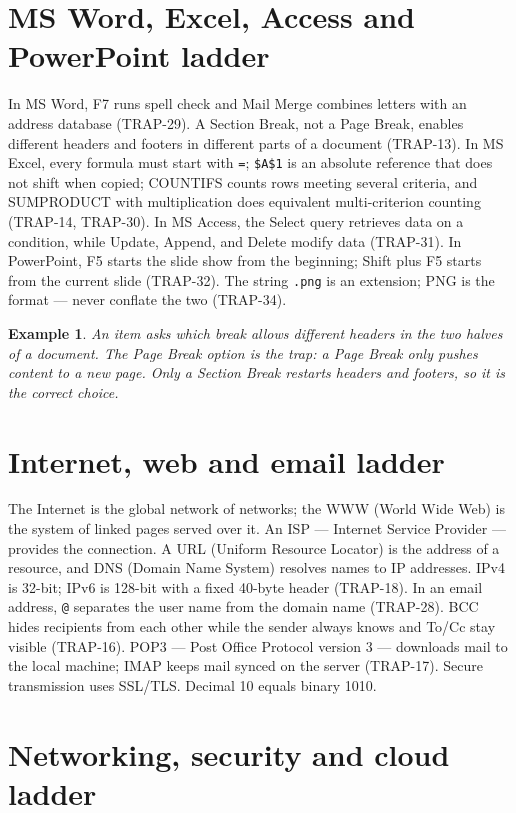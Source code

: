 \documentclass[11pt]{article}
\newtheorem{example}{Example}[section]
\begin{document}
\section{MS Word, Excel, Access and PowerPoint ladder}

In MS Word, F7 runs spell check and Mail Merge combines letters with an
address database (TRAP-29). A Section Break, not a Page Break, enables
different headers and footers in different parts of a document (TRAP-13). In
MS Excel, every formula must start with \texttt{=}; \texttt{\$A\$1} is an
absolute reference that does not shift when copied; COUNTIFS counts rows
meeting several criteria, and SUMPRODUCT with multiplication does equivalent
multi-criterion counting (TRAP-14, TRAP-30). In MS Access, the Select query
retrieves data on a condition, while Update, Append, and Delete modify data
(TRAP-31). In PowerPoint, F5 starts the slide show from the beginning; Shift
plus F5 starts from the current slide (TRAP-32). The string \texttt{.png} is an
extension; PNG is the format --- never conflate the two (TRAP-34).

\begin{example}
An item asks which break allows different headers in the two halves of a
document. The Page Break option is the trap: a Page Break only pushes content
to a new page. Only a Section Break restarts headers and footers, so it is the
correct choice.
\end{example}

\section{Internet, web and email ladder}

The Internet is the global network of networks; the WWW (World Wide Web) is
the system of linked pages served over it. An ISP --- Internet Service
Provider --- provides the connection. A URL (Uniform Resource Locator) is the
address of a resource, and DNS (Domain Name System) resolves names to IP
addresses. IPv4 is 32-bit; IPv6 is 128-bit with a fixed 40-byte header
(TRAP-18). In an email address, \texttt{@} separates the user name from the
domain name (TRAP-28). BCC hides recipients from each other while the sender
always knows and To/Cc stay visible (TRAP-16). POP3 --- Post Office Protocol
version 3 --- downloads mail to the local machine; IMAP keeps mail synced on
the server (TRAP-17). Secure transmission uses SSL/TLS. Decimal 10 equals
binary 1010.

\section{Networking, security and cloud ladder}
\end{document}
